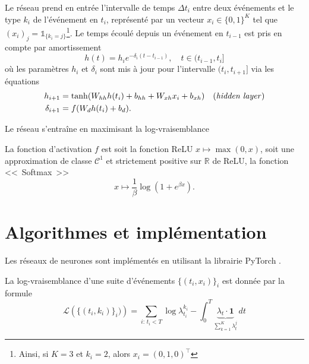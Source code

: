 \documentclass[11pt]{article}
\newcommand{\RR}{\mathbb{R}}
\begin{document}
Le réseau prend en entrée l'intervalle de temps $\Delta t_i$ entre deux événements et le type $k_i$ de l'événement en $t_i$, représenté par un vecteur $x_i\in{\{0,1\}}^K$ tel que $(x_i)_j = \mathds{1}_{\{k_i = j\}}$\footnote{Ainsi, si $K=3$ et $k_i = 2$, alors $x_i = (0,1,0)^\intercal$}.
Le temps écoulé depuis un événement en $t_{i-1}$ est pris en compte par amortissement
\begin{equation}
	h(t) = h_{i}e^{-\delta_i(t-t_{i-1})},\quad t\in(t_{i-1},t_i]
\end{equation}
où les paramètres $h_i$ et $\delta_i$ sont mis à jour pour l'intervalle $(t_i,t_{i+1}]$ via les équations
\begin{subequations}
\begin{align}
h_{i+1} &= \tanh(W_{hh}h(t_i) + b_{hh} + W_{xh}x_i + b_{xh})\quad\text{(\textit{hidden layer})} \\
\delta_{i+1} &= f(W_dh(t_i) + b_d).
\end{align}
\end{subequations}

Le réseau s'entraîne en maximisant la log-vraisemblance

La fonction d'activation $f$ est soit la fonction ReLU $x\mapsto \max(0,x)$, soit une approximation de classe $\mathcal C^1$ et strictement positive sur $\RR$ de ReLU, la fonction <<~Softmax~>>
\[
x\mapsto \frac{1}{\beta}\log(1+e^{\beta x}).
\]


\section{Algorithmes et implémentation}

Les réseaux de neurones sont implémentés en utilisant la librairie \textsf{PyTorch} \cite{paszke2017automatic}.

La log-vraisemblance d'une suite d'événements $\{(t_i,x_i)\}_i$ est donnée par la formule
\begin{equation}
\mathcal{L}\left(\{(t_i,k_i)\}_i)\right)
=
\sum_{i:\,t_i < T} \log\lambda^{k_i}_{t_i} - \int_0^T \underbrace{\lambda_t\cdot\mathbf{1}}_{\sum_{k=1}^K\lambda^j_t}\,dt
\end{equation}


\printbibliography
\end{document}
